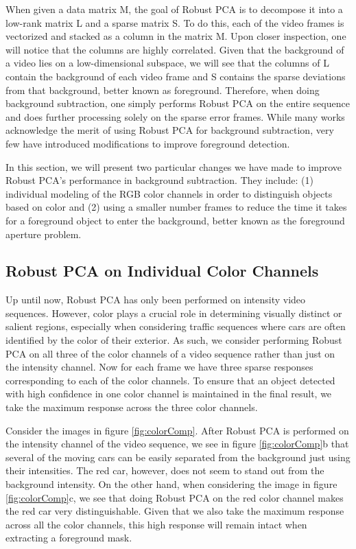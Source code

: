 \documentclass{article}
\begin{document}
When given a data matrix M, the goal of Robust PCA is to decompose it into a low-rank matrix L and a sparse matrix S. To do this, each of the video frames is vectorized and stacked as a column in the matrix M. Upon closer inspection, one will notice that the columns are highly correlated. %
Given that the background of a video lies on a low-dimensional subspace, we will see that the columns of L contain the background of each video frame and S contains the sparse deviations from that background, better known as foreground. Therefore, when doing background subtraction, one simply performs Robust PCA on the entire sequence and does further processing solely on the sparse error frames. While many works acknowledge the merit of using Robust PCA for background subtraction, very few have introduced modifications to improve foreground detection. 

In this section, we will present two particular changes we have made to improve Robust PCA's performance in background subtraction. They include: (1) individual modeling of the RGB color channels in order to distinguish objects based on color and (2) using a smaller number frames to reduce the time it takes for a foreground object to enter the background, better known as the foreground aperture problem.


\subsection{Robust PCA on Individual Color Channels}

Up until now, Robust PCA has only been performed on intensity video sequences. However, color plays a crucial role in determining visually distinct or salient regions, especially when considering traffic sequences where cars are often identified by the color of their exterior. As such, we consider performing Robust PCA on all three of the color channels of a video sequence rather than just on the intensity channel. Now for each frame we have three sparse responses corresponding to each of the color channels. To ensure that an object detected with high confidence in one color channel is maintained in the final result, we take the maximum response across the three color channels.

Consider the images in figure \ref{fig:colorComp}. After Robust PCA is performed on the intensity channel of the video sequence, we see in figure \ref{fig:colorComp}b that several of the moving cars can be easily separated from the background just using their intensities. The red car, however, does not seem to stand out  from the background intensity. On the other hand, when considering the image in figure \ref{fig:colorComp}c, we see that doing Robust PCA on the red color channel makes the red car very distinguishable. Given that we also take the maximum response across all the color channels, this high response will remain intact when extracting a foreground mask.
\end{document}
